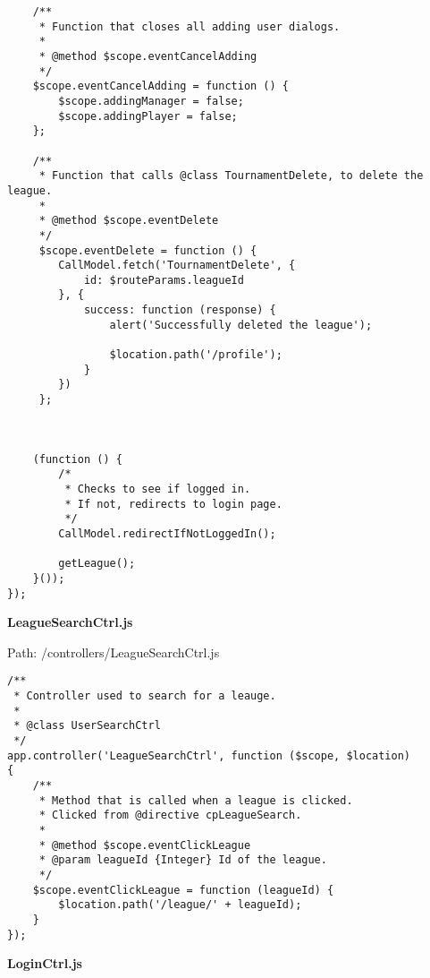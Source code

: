 {\begin{lstlisting}
	/**
	 * Function that closes all adding user dialogs.
	 *
	 * @method $scope.eventCancelAdding
	 */
	$scope.eventCancelAdding = function () {
		$scope.addingManager = false;
		$scope.addingPlayer = false;
	};

	/**
	 * Function that calls @class TournamentDelete, to delete the league.
	 *
	 * @method $scope.eventDelete
	 */
	 $scope.eventDelete = function () {
	 	CallModel.fetch('TournamentDelete', {
	 		id: $routeParams.leagueId
	 	}, {
	 		success: function (response) {
	 			alert('Successfully deleted the league');

	 			$location.path('/profile');
	 		}
	 	})
	 };



	(function () {
		/* 
		 * Checks to see if logged in.
		 * If not, redirects to login page.
		 */
		CallModel.redirectIfNotLoggedIn();

		getLeague();
	}());
});\end{lstlisting}
}
\textbf{LeagueSearchCtrl.js}\label{LeagueSearchCtrl.js}

Path: /controllers/LeagueSearchCtrl.js
{\scriptsize
\begin{lstlisting}
/**
 * Controller used to search for a leauge.
 *
 * @class UserSearchCtrl
 */
app.controller('LeagueSearchCtrl', function ($scope, $location)
{
	/**
	 * Method that is called when a league is clicked.
	 * Clicked from @directive cpLeagueSearch.
	 *
	 * @method $scope.eventClickLeague
	 * @param leagueId {Integer} Id of the league.
	 */
	$scope.eventClickLeague = function (leagueId) {
		$location.path('/league/' + leagueId);
	}
});\end{lstlisting}
}
\textbf{LoginCtrl.js}\label{LoginCtrl.js}

